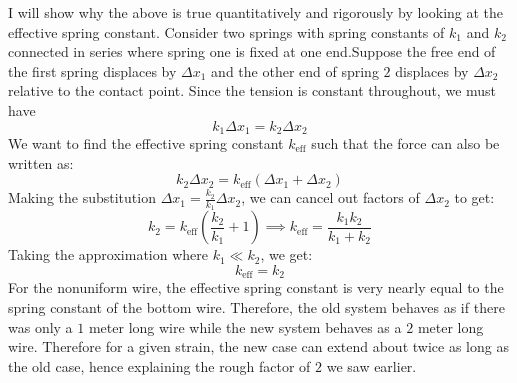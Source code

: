 \documentclass{article}
\begin{document}
I will show why the above is true quantitatively and rigorously by looking at the effective spring constant. Consider two springs with spring constants of $k_1$ and $k_2$ connected in series where spring one is fixed at one end.Suppose the free end of the first spring displaces by $\Delta x_1$ and the other end of spring $2$ displaces by $\Delta x_2$ relative to the contact point. Since the tension is constant throughout, we must have
    \begin{equation}
        k_1\Delta x_1=k_2\Delta x_2
        \label{eq:}
    \end{equation}
    We want to find the effective spring constant $k_\text{eff}$ such that the force can also be written as:
    \begin{equation}
        k_2\Delta x_2=k_\text{eff}(\Delta x_1+\Delta x_2)
        \label{eq:}
    \end{equation}
    Making the substitution $\Delta x_1=\frac{k_2}{k_1}\Delta x_2$, we can cancel out factors of $\Delta x_2$ to get:
    \begin{equation}
        k_2=k_\text{eff}\left(\frac{k_2}{k_1}+1\right) \implies k_\text{eff} = \frac{k_1k_2}{k_1+k_2}
        \label{eq:}
    \end{equation}
    Taking the approximation where $k_1 \ll k_2$, we get:
    \begin{equation}
        k_\text{eff}=k_2
        \label{eq:}
    \end{equation}
For the nonuniform wire, the effective spring constant is very nearly equal to the spring constant of the bottom wire. Therefore, the old system behaves as if there was only a $1$ meter long wire while the new system behaves as a $2$ meter long wire. Therefore for a given strain, the new case can extend about twice as long as the old case, hence explaining the rough factor of $2$ we saw earlier.
\vspace{2mm}
\end{document}
